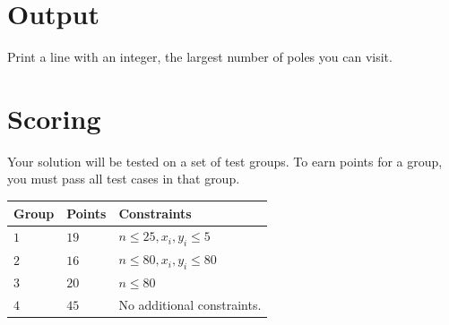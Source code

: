 \section*{Output}
Print a line with an integer, the largest number of poles you can visit.

\section*{Scoring}
Your solution will be tested on a set of test groups.
To earn points for a group, you must pass all test cases in that group.

\noindent
\begin{tabular}{| l | l | l |}
\hline
\textbf{Group} & \textbf{Points} & \textbf{Constraints} \\ \hline
$1$   & $19$       & $n \leq 25, x_{i}, y_{i} \leq 5$ \\ \hline
$2$   & $16$       & $n \leq 80, x_{i}, y_{i} \leq 80$ \\ \hline
$3$   & $20$       & $n \leq 80$ \\ \hline
$4$   & $45$       & No additional constraints. \\ \hline
\end{tabular}
